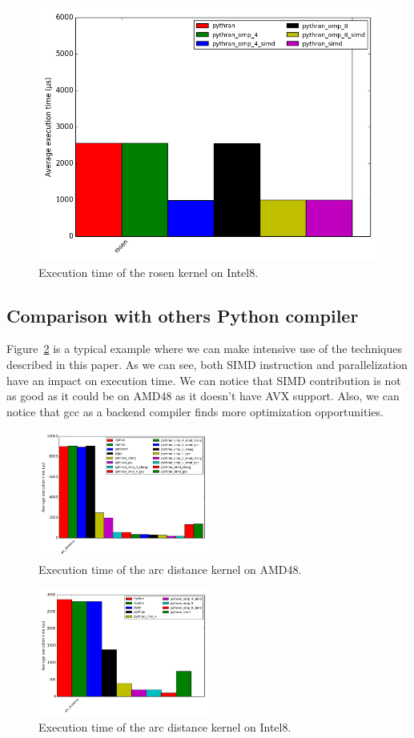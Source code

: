 \documentclass[10pt, preprint]{sigplanconf}
\begin{document}
\begin{figure}[t]
\centering
\includegraphics[width=.5\textwidth]{rosen_intel8.png}
\caption{Execution time of the rosen kernel on Intel8.}
\label{fig:rosenintel8}
\end{figure}


\subsection{Comparison with others Python compiler}

Figure~\ref{fig:arc_distance} is a typical example where we can make intensive
use of the techniques described in this paper. As we can see, both SIMD instruction
and parallelization have an impact on execution time. We can notice that SIMD
contribution is not as good as it could be on AMD48 as it doesn't have AVX support.
Also, we can notice that gcc as a backend compiler finds more optimization opportunities.

\begin{figure}[t]
\centering
\includegraphics[width=0.5\textwidth]{arc_distance_amd48.png}
\caption{Execution time of the arc distance kernel on AMD48.}
\label{fig:arc_distance}
\end{figure}

\begin{figure}[t]
\centering
\includegraphics[width=0.5\textwidth]{arc_distance_intel8.png}
\caption{Execution time of the arc distance kernel on Intel8.}
\label{fig:arc_distance_intel8}
\end{figure}
\end{document}
